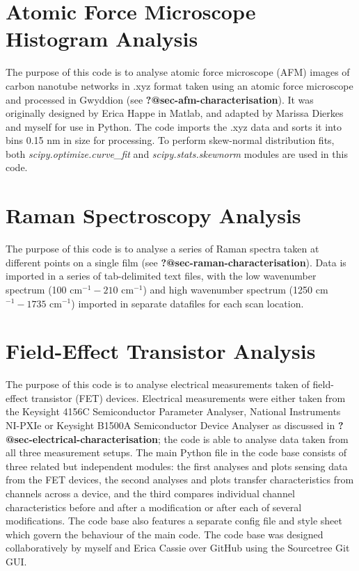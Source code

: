 \documentclass[
  a4paper,
]{scrbook}
\begin{document}
\hypertarget{sec-histogram-analysis}{%
\section{Atomic Force Microscope Histogram
Analysis}\label{sec-histogram-analysis}}

The purpose of this code is to analyse atomic force microscope (AFM)
images of carbon nanotube networks in .xyz format taken using an atomic
force microscope and processed in Gwyddion (see
\textbf{?@sec-afm-characterisation}). It was originally designed by
Erica Happe in Matlab, and adapted by Marissa Dierkes and myself for use
in Python. The code imports the .xyz data and sorts it into bins 0.15 nm
in size for processing. To perform skew-normal distribution fits, both
\emph{scipy.optimize.curve\_fit} and \emph{scipy.stats.skewnorm} modules
are used in this code.

\hypertarget{sec-raman-analysis}{%
\section{Raman Spectroscopy Analysis}\label{sec-raman-analysis}}

The purpose of this code is to analyse a series of Raman spectra taken
at different points on a single film (see
\textbf{?@sec-raman-characterisation}). Data is imported in a series of
tab-delimited text files, with the low wavenumber spectrum (100
cm\(^{-1} - 210\) cm\(^{-1}\)) and high wavenumber spectrum (1250
cm\(^{-1} - 1735\) cm\(^{-1}\)) imported in separate datafiles for each
scan location.

\hypertarget{sec-field-effect-transistor-analysis}{%
\section{Field-Effect Transistor
Analysis}\label{sec-field-effect-transistor-analysis}}

The purpose of this code is to analyse electrical measurements taken of
field-effect transistor (FET) devices. Electrical measurements were
either taken from the Keysight 4156C Semiconductor Parameter Analyser,
National Instruments NI-PXIe or Keysight B1500A Semiconductor Device
Analyser as discussed in \textbf{?@sec-electrical-characterisation}; the
code is able to analyse data taken from all three measurement setups.
The main Python file in the code base consists of three related but
independent modules: the first analyses and plots sensing data from the
FET devices, the second analyses and plots transfer characteristics from
channels across a device, and the third compares individual channel
characteristics before and after a modification or after each of several
modifications. The code base also features a separate config file and
style sheet which govern the behaviour of the main code. The code base
was designed collaboratively by myself and Erica Cassie over GitHub
using the Sourcetree Git GUI.
\end{document}
